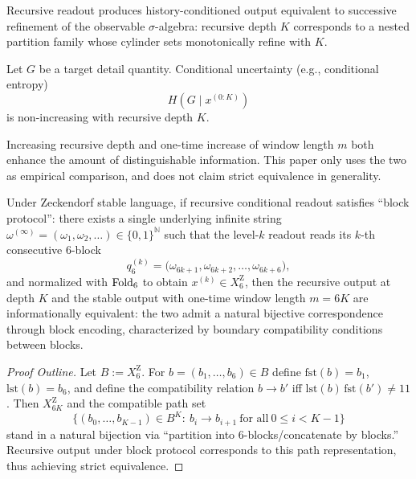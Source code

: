 \begin{proposition}\label{prop:fw-rec-R1}
Recursive readout produces history-conditioned output equivalent to successive refinement of the observable $\sigma$-algebra: recursive depth $K$ corresponds to a nested partition family whose cylinder sets monotonically refine with $K$.
\end{proposition}

\begin{proposition}\label{prop:fw-rec-R2}
Let $G$ be a target detail quantity. Conditional uncertainty (e.g., conditional entropy)
$$
H(G\mid x^{(0:K)})
$$
is non-increasing with recursive depth $K$.
\end{proposition}

\begin{proposition}\label{prop:fw-rec-R3}
Increasing recursive depth and one-time increase of window length $m$ both enhance the amount of distinguishable information. This paper only uses the two as empirical comparison, and does not claim strict equivalence in generality.
\end{proposition}

\begin{proposition}\label{prop:fw-rec-R4-block-equivalence}
Under Zeckendorf stable language, if recursive conditional readout satisfies ``block protocol'': there exists a single underlying infinite string $\omega^{(\infty)}=(\omega_1,\omega_2,\dots)\in\{0,1\}^{\mathbb{N}}$ such that the level-$k$ readout reads its $k$-th consecutive 6-block
\[
q_6^{(k)}=\bigl(\omega_{6k+1},\omega_{6k+2},\dots,\omega_{6k+6}\bigr),
\]
and normalized with $\mathrm{Fold}_6$ to obtain $x^{(k)}\in X_6^{\mathrm Z}$, then the recursive output at depth $K$ and the stable output with one-time window length $m=6K$ are informationally equivalent: the two admit a natural bijective correspondence through block encoding, characterized by boundary compatibility conditions between blocks.
\end{proposition}

\begin{proof}[Proof Outline]
Let $B:=X_6^{\mathrm Z}$. For $b=(b_1,\dots,b_6)\in B$ define $\mathrm{fst}(b)=b_1$, $\mathrm{lst}(b)=b_6$, and define the compatibility relation $b\to b'$ iff $\mathrm{lst}(b)\,\mathrm{fst}(b')\neq 11$. Then $X_{6K}^{\mathrm Z}$ and the compatible path set
\[
\{(b_0,\dots,b_{K-1})\in B^K:\ b_i\to b_{i+1}\ \text{for all}\ 0\le i<K-1\}
\]
stand in a natural bijection via ``partition into 6-blocks/concatenate by blocks.'' Recursive output under block protocol corresponds to this path representation, thus achieving strict equivalence.
\end{proof}

